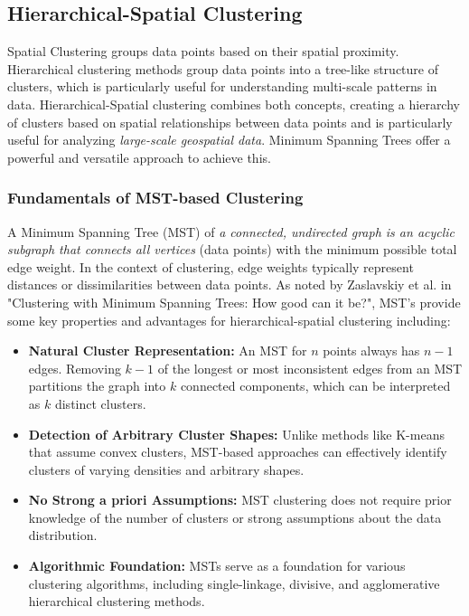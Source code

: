 \begin{multicols}{2}

\subsection{Hierarchical-Spatial Clustering}
Spatial Clustering groups data points based on their spatial proximity. 
Hierarchical clustering methods group data points into a tree-like structure of clusters, which is particularly useful for understanding multi-scale patterns in data. 
Hierarchical-Spatial clustering combines both concepts, creating a hierarchy of clusters based on spatial relationships between data points and is particularly useful for analyzing \textit{large-scale geospatial data}.
Minimum Spanning Trees offer a powerful and versatile approach to achieve this.

\subsubsection{Fundamentals of MST-based Clustering}
A Minimum Spanning Tree (MST) of \textit{a connected, undirected graph is an acyclic subgraph that connects all vertices} (data points) with the minimum possible total edge weight. 
In the context of clustering, edge weights typically represent distances or dissimilarities between data points. As noted by Zaslavskiy et al. in "Clustering with Minimum Spanning Trees: How good can it be?"\cite{gagolewski_MST_Clustering_how_good_2024}, 
MST's provide some key properties and advantages for hierarchical-spatial clustering including:
\begin{itemize}
    \item \textbf{Natural Cluster Representation:} An MST for $n$ points always has $n-1$ edges. Removing $k-1$ of the longest or most inconsistent edges from an MST partitions the graph into $k$ connected components, which can be interpreted as $k$ distinct clusters.
    \item \textbf{Detection of Arbitrary Cluster Shapes:} Unlike methods like K-means that assume convex clusters, MST-based approaches can effectively identify clusters of varying densities and arbitrary shapes.
    \item \textbf{No Strong a priori Assumptions:} MST clustering does not require prior knowledge of the number of clusters or strong assumptions about the data distribution.
    \item \textbf{Algorithmic Foundation:} MSTs serve as a foundation for various clustering algorithms, including single-linkage, divisive, and agglomerative hierarchical clustering methods.
\end{itemize}


\end{multicols}
